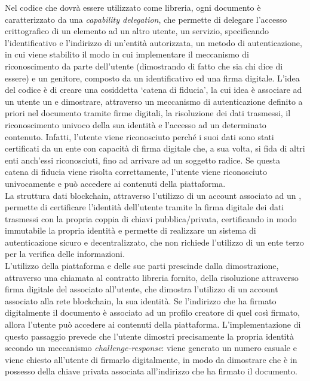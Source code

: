 \newpage

Nel codice che dovrà essere utilizzato come libreria,
ogni documento è caratterizzato da una \textit{capability delegation}, che permette di delegare l'accesso crittografico di un elemento ad un altro utente,
un servizio, specificando l'identificativo e l'indirizzo di un'entità autorizzata, un metodo di autenticazione, in cui viene stabilito
il modo in cui implementare il meccanismo di riconoscimento da parte dell'utente (dimostrando di fatto che sia chi dice di essere) e un 
genitore, composto da un identificativo ed una firma digitale.
L'idea del codice è di creare una cosiddetta `catena di fiducia', la cui idea è associare ad un utente un  e dimostrare,
attraverso un meccanismo di autenticazione definito a priori nel documento tramite firme digitali, la risoluzione dei dati trasmessi, il riconoscimento univoco della sua identità
e l'accesso ad un determinato contenuto. Infatti, l'utente viene riconosciuto perché i suoi dati sono stati certificati da un ente 
con capacità di firma digitale che, a sua volta, si fida di altri enti anch'essi riconosciuti, fino ad arrivare ad un soggetto radice.
Se questa catena di fiducia viene risolta correttamente, l'utente viene riconosciuto univocamente e può accedere ai contenuti della piattaforma. \\

La struttura dati blockchain, attraverso l'utilizzo di un account associato ad un , permette di certificare l'identità dell'utente
tramite la firma digitale dei dati trasmessi con la propria coppia di chiavi pubblica/privata, certificando in modo immutabile la propria identità e
permette di realizzare un sistema di autenticazione sicuro e decentralizzato, che non richiede l'utilizzo di un ente terzo per la verifica delle informazioni. \\

L'utilizzo della piattaforma e delle sue parti prescinde dalla dimostrazione, attraverso una chiamata al contratto libreria fornito, della risoluzione attraverso firma digitale
del  associato all'utente, che dimostra l'utilizzo di un account associato alla rete blockchain,
la sua identità. Se l'indirizzo che ha firmato digitalmente il documento è associato ad un profilo creatore di quel  così firmato,
allora l'utente può accedere ai contenuti della piattaforma. L'implementazione di questo passaggio prevede che l'utente dimostri precisamente
la propria identità secondo un meccanismo \textit{challenge-response}: viene generato un numero casuale e viene chiesto all'utente di firmarlo digitalmente, in modo da dimostrare
che è in possesso della chiave privata associata all'indirizzo che ha firmato il documento. \\


